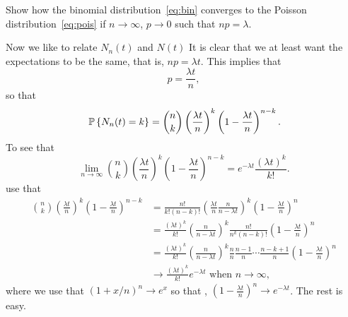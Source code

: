 \begin{question}
  Show how the binomial distribution~\eqref{eq:bin} converges to the
  Poisson distribution~\eqref{eq:pois} if $n\to\infty$, $p\to0$ such
  that $np=\lambda$.

  \begin{solution} Now we like to relate $N_n(t)$ and $N(t)$ It is
    clear that we at least want the expectations to be the same, that
    is, $np = \lambda t$. This implies that
\begin{equation*}
  p = \frac{\lambda t}n,
\end{equation*}
so that 
\begin{equation*}
  \P{N_n(t) = k} = {n \choose k} \left(\frac{\lambda t}{n}\right)^k \left(1-\frac{\lambda t}n\right)^{n-k}.
\end{equation*}
To see that 
\begin{equation*}\label{eq:52}
  \lim_{n\to\infty} {n \choose k} \left(\frac{\lambda t}{n}\right)^k \left(1-\frac{\lambda t}n\right)^{n-k} = e^{-\lambda t} \frac{(\lambda t)^k}{k!}.
\end{equation*}
use that
    \begin{equation*}
      \begin{split}
      {n \choose k} \left(\frac{\lambda t}{n}\right)^k \left(1-\frac{\lambda t}n\right)^{n-k} 
&= \frac{n!}{k!(n-k)!} \left(\frac{\lambda t}{n}\frac{n}{n-\lambda t}\right)^k \left(1-\frac{\lambda t}n\right)^{n} \\
&= \frac{(\lambda t)^k}{k!} \left(\frac n{n-\lambda t} \right)^k  \frac{n!}{n^k(n-k)!}\left(1-\frac{\lambda t}n\right)^{n}\\
&= \frac{(\lambda t)^k}{k!} \left(\frac n{n-\lambda t} \right)^k \frac{n}{n}\frac{n-1}{n}\cdots\frac{n-k+1}{n} \left(1-\frac{\lambda t}n\right)^{n}  \\
&\to \frac{(\lambda t)^k}{k!} e^{-\lambda t} \text{ when } n \to \infty, 
      \end{split}
    \end{equation*}
    where we use that $(1+x/n)^n\to e^{x}$ so that ,
    $\left(1-\frac{\lambda t}n\right)^{n} \to e^{-\lambda t}$.  The
    rest is easy.
  \end{solution}
\end{question}


